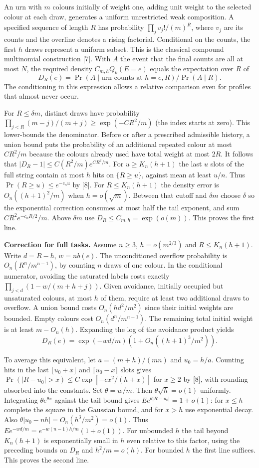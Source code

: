 An urn with $m$ colours initially of weight one, adding unit weight to the selected colour at each draw, generates a uniform unrestricted weak composition. A specified sequence of length $R$ has probability $\prod_j v_j!/(m)^{\overline R}$, where $v_j$ are its counts and the overline denotes a rising factorial. Conditional on the counts, the first $h$ draws represent a uniform subset. This is the classical compound multinomial construction [7]. With $A$ the event that the final counts are all at most $N$, the required density $C_{m,h}Q_k(E=e)$ equals the expectation over $R$ of
\[
 D_R(e)=\Pr(A\mid\text{urn counts at }h=e,R)/\Pr(A\mid R).
\]
The conditioning in this expression allows a relative comparison even for profiles that almost never occur.

For $R\le\delta m$, distinct draws have probability $\prod_{j<R}(m-j)/(m+j)\ge\exp(-C R^2/m)$ (the index starts at zero). This lower-bounds the denominator. Before or after a prescribed admissible history, a union bound puts the probability of an additional repeated colour at most $C R^2/m$ because the colours already used have total weight at most $2R$. It follows that $|D_R-1|\le C(R^2/m)e^{CR^2/m}$. For $u\ge K_n(h+1)$ the last $u$ slots of the full string contain at most $h$ hits on $\{R\ge u\}$, against mean at least $u/n$. Thus $\Pr(R\ge u)\le e^{-c_n u}$ by [8]. For $R\le K_n(h+1)$ the density error is $O_n((h+1)^2/m)$ when $h=o(\sqrt m)$. Between that cutoff and $\delta m$ choose $\delta$ so the exponential correction consumes at most half the tail exponent, and sum $C R^2 e^{-c_n R/2}/m$. Above $\delta m$ use $D_R\le C_{m,h}=\exp(o(m))$. This proves the first line.

\textbf{Correction for full tasks.} Assume $n\ge3$, $h=o(m^{2/3})$ and $R\le K_n(h+1)$. Write $d=R-h$, $w=n b(e)$. The unconditioned overflow probability is $O_n(R^n/m^{n-1})$, by counting $n$ draws of one colour. In the conditional numerator, avoiding the saturated labels costs exactly $\prod_{j<d}(1-w/(m+h+j))$. Given avoidance, initially occupied but unsaturated colours, at most $h$ of them, require at least two additional draws to overflow. A union bound costs $O_n(h d^2/m^2)$ since their initial weights are bounded. Empty colours cost $O_n(d^n/m^{n-1})$. The remaining total initial weight is at least $m-O_n(h)$. Expanding the log of the avoidance product yields
\[
 D_R(e)=\exp(-wd/m)\left(1+O_n((h+1)^3/m^2)\right).
\]

To average this equivalent, let $a=(m+h)/(mn)$ and $u_0=h/a$. Counting hits in the last $\lfloor u_0+x\rfloor$ and $\lceil u_0-x\rceil$ slots gives
$\Pr(|R-u_0|>x)\le C\exp[-c x^2/(h+x)]$ for $x\ge2$ by [8], with rounding absorbed into the constants. Set $\theta=w/m$. Then $\theta\sqrt h=o(1)$ uniformly. Integrating $\theta e^{\theta x}$ against the tail bound gives $Ee^{\theta|R-u_0|}=1+o(1)$: for $x\le h$ complete the square in the Gaussian bound, and for $x>h$ use exponential decay. Also $\theta|u_0-nh|=O_n(h^3/m^2)=o(1)$. Thus $E e^{-wd/m}=e^{-w(n-1)h/m}(1+o(1))$. For unbounded $h$ the tail beyond $K_n(h+1)$ is exponentially small in $h$ even relative to this factor, using the preceding bounds on $D_R$ and $h^2/m=o(h)$. For bounded $h$ the first line suffices. This proves the second line.

